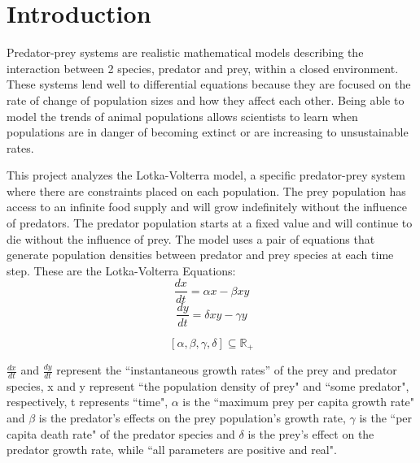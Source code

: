 \documentclass[12pt]{article}
\begin{document}
\thispagestyle{empty}

\setcounter{page}{0}

\newpage

\tableofcontents 

\newpage

\section{Introduction}

Predator-prey systems are realistic mathematical models describing the interaction between 2 species, predator and prey, within a closed environment. These systems lend well to differential equations because they are focused on the rate of change of population sizes and how they affect each other. Being able to model the trends of animal populations allows scientists to learn when populations are in danger of becoming extinct or are increasing to unsustainable rates.  

This project analyzes the Lotka-Volterra model, a specific predator-prey system where there are constraints placed on each population. The prey population has access to an infinite food supply and will grow indefinitely without the influence of predators. The predator population starts at a fixed value and will continue to die without the influence of prey. The model uses a pair of equations that generate population densities between predator and prey species at each time step. 
These are the Lotka-Volterra Equations: 
\[\frac{dx}{dt}=\alpha x-\beta xy\]
\[\frac{dy}{dt}=\delta xy- \gamma y\]

\[[\alpha,\beta,\gamma,\delta]\subseteq {\mathbb{R}}_{+}\]

\(\frac{dx}{dt}\) and \(\frac{dy}{dt}\) represent the ``instantaneous growth rates'' of the prey and predator species,
x and y represent ``the population density of prey" and ``some predator", respectively, t represents ``time",
\(\alpha\) is the ``maximum prey per capita growth rate" and \(\beta\) is the predator's effects on the prey population's growth rate,
\(\gamma\) is the ``per capita death rate" of the predator species and \(\delta\) is the prey's effect on the predator growth rate, while ``all parameters are positive and real"\cite{foundation_2023}.
\end{document}
